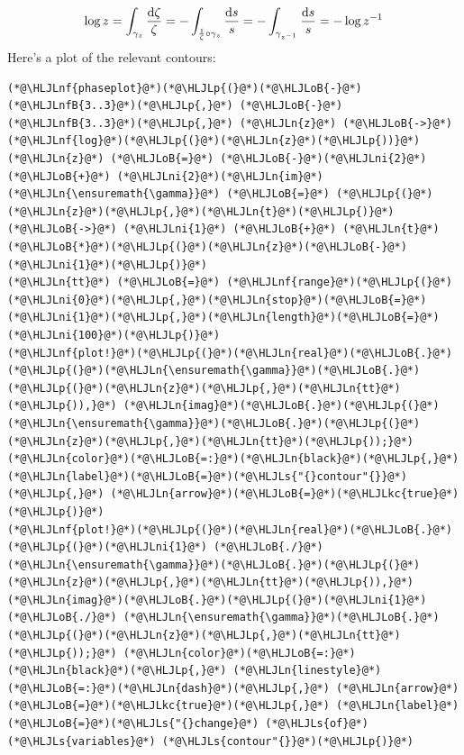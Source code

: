 \documentclass[12pt,a4paper]{article}
\newcommand{\HLJLkc}[1]{\textcolor[RGB]{59,151,46}{\textit{#1}}}
\newcommand{\HLJLn}[1]{#1}
\newcommand{\HLJLnf}[1]{\textcolor[RGB]{66,102,213}{#1}}
\newcommand{\HLJLs}[1]{\textcolor[RGB]{201,61,57}{#1}}
\newcommand{\HLJLnfB}[1]{\textcolor[RGB]{59,151,46}{#1}}
\newcommand{\HLJLni}[1]{\textcolor[RGB]{59,151,46}{#1}}
\newcommand{\HLJLoB}[1]{\textcolor[RGB]{102,102,102}{\textbf{#1}}}
\newcommand{\HLJLp}[1]{#1}
\def\D{ {\rm d} }
\begin{document}
\[
\log z = \int_{\gamma_z} {\D\zeta \over \zeta} = -\int_{{1 \over \zeta} \circ \gamma_z} {\D s \over s} = - \int_{\gamma_{z^{-1}}} {\D s \over s} = -\log z^{-1} 
\]
Here's a plot of the relevant contours:


\begin{lstlisting}
(*@\HLJLnf{phaseplot}@*)(*@\HLJLp{(}@*)(*@\HLJLoB{-}@*)(*@\HLJLnfB{3..3}@*)(*@\HLJLp{,}@*) (*@\HLJLoB{-}@*)(*@\HLJLnfB{3..3}@*)(*@\HLJLp{,}@*) (*@\HLJLn{z}@*) (*@\HLJLoB{->}@*) (*@\HLJLnf{log}@*)(*@\HLJLp{(}@*)(*@\HLJLn{z}@*)(*@\HLJLp{))}@*)
(*@\HLJLn{z}@*) (*@\HLJLoB{=}@*) (*@\HLJLoB{-}@*)(*@\HLJLni{2}@*) (*@\HLJLoB{+}@*) (*@\HLJLni{2}@*)(*@\HLJLn{im}@*)
(*@\HLJLn{\ensuremath{\gamma}}@*) (*@\HLJLoB{=}@*) (*@\HLJLp{(}@*)(*@\HLJLn{z}@*)(*@\HLJLp{,}@*)(*@\HLJLn{t}@*)(*@\HLJLp{)}@*) (*@\HLJLoB{->}@*) (*@\HLJLni{1}@*) (*@\HLJLoB{+}@*) (*@\HLJLn{t}@*)(*@\HLJLoB{*}@*)(*@\HLJLp{(}@*)(*@\HLJLn{z}@*)(*@\HLJLoB{-}@*)(*@\HLJLni{1}@*)(*@\HLJLp{)}@*)
(*@\HLJLn{tt}@*) (*@\HLJLoB{=}@*) (*@\HLJLnf{range}@*)(*@\HLJLp{(}@*)(*@\HLJLni{0}@*)(*@\HLJLp{,}@*)(*@\HLJLn{stop}@*)(*@\HLJLoB{=}@*)(*@\HLJLni{1}@*)(*@\HLJLp{,}@*)(*@\HLJLn{length}@*)(*@\HLJLoB{=}@*)(*@\HLJLni{100}@*)(*@\HLJLp{)}@*)
(*@\HLJLnf{plot!}@*)(*@\HLJLp{(}@*)(*@\HLJLn{real}@*)(*@\HLJLoB{.}@*)(*@\HLJLp{(}@*)(*@\HLJLn{\ensuremath{\gamma}}@*)(*@\HLJLoB{.}@*)(*@\HLJLp{(}@*)(*@\HLJLn{z}@*)(*@\HLJLp{,}@*)(*@\HLJLn{tt}@*)(*@\HLJLp{)),}@*) (*@\HLJLn{imag}@*)(*@\HLJLoB{.}@*)(*@\HLJLp{(}@*)(*@\HLJLn{\ensuremath{\gamma}}@*)(*@\HLJLoB{.}@*)(*@\HLJLp{(}@*)(*@\HLJLn{z}@*)(*@\HLJLp{,}@*)(*@\HLJLn{tt}@*)(*@\HLJLp{));}@*) (*@\HLJLn{color}@*)(*@\HLJLoB{=:}@*)(*@\HLJLn{black}@*)(*@\HLJLp{,}@*) (*@\HLJLn{label}@*)(*@\HLJLoB{=}@*)(*@\HLJLs{"{}contour"{}}@*)(*@\HLJLp{,}@*) (*@\HLJLn{arrow}@*)(*@\HLJLoB{=}@*)(*@\HLJLkc{true}@*)(*@\HLJLp{)}@*)
(*@\HLJLnf{plot!}@*)(*@\HLJLp{(}@*)(*@\HLJLn{real}@*)(*@\HLJLoB{.}@*)(*@\HLJLp{(}@*)(*@\HLJLni{1}@*) (*@\HLJLoB{./}@*) (*@\HLJLn{\ensuremath{\gamma}}@*)(*@\HLJLoB{.}@*)(*@\HLJLp{(}@*)(*@\HLJLn{z}@*)(*@\HLJLp{,}@*)(*@\HLJLn{tt}@*)(*@\HLJLp{)),}@*) (*@\HLJLn{imag}@*)(*@\HLJLoB{.}@*)(*@\HLJLp{(}@*)(*@\HLJLni{1}@*) (*@\HLJLoB{./}@*) (*@\HLJLn{\ensuremath{\gamma}}@*)(*@\HLJLoB{.}@*)(*@\HLJLp{(}@*)(*@\HLJLn{z}@*)(*@\HLJLp{,}@*)(*@\HLJLn{tt}@*)(*@\HLJLp{));}@*) (*@\HLJLn{color}@*)(*@\HLJLoB{=:}@*)(*@\HLJLn{black}@*)(*@\HLJLp{,}@*) (*@\HLJLn{linestyle}@*)(*@\HLJLoB{=:}@*)(*@\HLJLn{dash}@*)(*@\HLJLp{,}@*) (*@\HLJLn{arrow}@*)(*@\HLJLoB{=}@*)(*@\HLJLkc{true}@*)(*@\HLJLp{,}@*) (*@\HLJLn{label}@*)(*@\HLJLoB{=}@*)(*@\HLJLs{"{}change}@*) (*@\HLJLs{of}@*) (*@\HLJLs{variables}@*) (*@\HLJLs{contour"{}}@*)(*@\HLJLp{)}@*)

\end{lstlisting}
\end{document}
